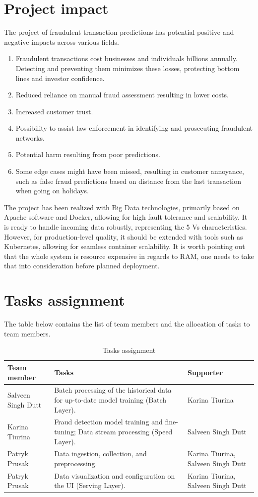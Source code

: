 \documentclass[12pt,a4paper, hidelinks]{article}
\begin{document}
\section{Project impact}
The project of fraudulent transaction predictions has potential positive and negative impacts across various fields.
\begin{enumerate}
    \item Fraudulent transactions cost businesses and individuals billions annually. Detecting and preventing them minimizes these losses, protecting bottom lines and investor confidence.
    \item Reduced reliance on manual fraud assessment resulting in lower costs.
    \item Increased customer trust.
    \item Possibility to assist law enforcement in identifying and prosecuting fraudulent networks.
    \item Potential harm resulting from poor predictions.
    \item Some edge cases might have been missed, resulting in customer annoyance, such as false fraud predictions based on distance from the last transaction when going on holidays.
\end{enumerate}
The project has been realized with Big Data technologies, primarily based on Apache software and Docker, allowing for high fault tolerance and scalability. It is ready to handle incoming data robustly, representing the 5 Vs characteristics. However, for production-level quality, it should be extended with tools such as Kubernetes, allowing for seamless container scalability. It is worth pointing out that the whole system is resource expensive in regards to RAM, one needs to take that into consideration before planned deployment.

\section{Tasks assignment}

The table below contains the list of team members and the allocation of tasks to team members.

\begin{table}[htbp]
\centering
\begin{tabular}{|p{4cm}|p{6.5cm}|p{4cm}|}
\hline
\textbf{Team member} & \textbf{Tasks} & \textbf{Supporter} \\
\hline
Salveen Singh Dutt & Batch processing of the historical data for up-to-date model training (Batch Layer). & Karina Tiurina \\
\hline
Karina Tiurina & Fraud detection model training and fine-tuning; Data stream processing (Speed Layer). & Salveen Singh Dutt \\
\hline
Patryk Prusak & Data ingestion, collection, and preprocessing. & Karina Tiurina, Salveen Singh Dutt  \\
\hline
Patryk Prusak & Data visualization and configuration on the UI (Serving Layer). & Karina Tiurina, Salveen Singh Dutt \\
\hline
\end{tabular}
\caption{Tasks assignment}
\end{table}
\end{document}
